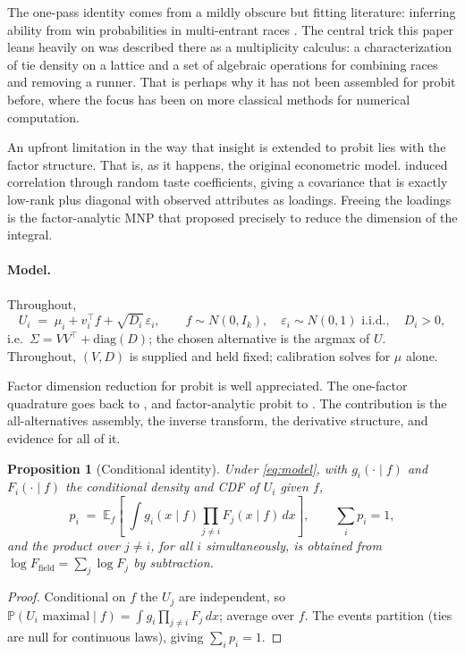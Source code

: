 \documentclass[12pt]{article}
\newtheorem{proposition}{Proposition}
\theoremstyle{remark}
\newcommand{\E}{\mathbb{E}}
\newcommand{\Prob}{\mathbb{P}}
\begin{document}
The one-pass identity comes from a mildly obscure but fitting literature: inferring ability
from win probabilities in multi-entrant races \citep{cotton2021}. The central trick this paper
leans heavily on was described there as a multiplicity calculus: a characterization of tie density 
on a lattice and a set of algebraic operations for combining races and removing a runner. That is
perhaps why it has not been assembled for probit before, where the focus has been on more classical methods
for numerical computation. 

An upfront limitation in the way that insight is extended to probit lies with the factor structure. That is, as it happens,
the original econometric model. \citet{hausman1978} induced correlation
through random taste coefficients, giving a covariance that is exactly
low-rank plus diagonal with observed attributes as loadings. Freeing the
loadings is the factor-analytic MNP that \citet{mcfadden1984} proposed
precisely to reduce the dimension of the integral. 

\paragraph{Model.} Throughout,
\begin{equation}
U_i \;=\; \mu_i + v_i^\top f + \sqrt{D_i}\,\varepsilon_i,
\qquad f \sim N(0, I_k), \quad \varepsilon_i \sim N(0,1) \text{ i.i.d.},
\quad D_i > 0,
\label{eq:model}
\end{equation}
i.e.\ $\Sigma = VV^\top + \mathrm{diag}(D)$; the chosen alternative is the
argmax of $U$. Throughout, $(V, D)$ is supplied and held fixed;
calibration solves for $\mu$ alone.

Factor dimension reduction for probit
is well appreciated. The one-factor quadrature goes back to \citet{butler1982},
and factor-analytic probit to \citet{elrod1995}. The
contribution is the all-alternatives assembly, the inverse transform, the
derivative structure, and evidence for all of it.

\begin{proposition}[Conditional identity]\label{prop:identity}
Under \eqref{eq:model}, with $g_i(\cdot \mid f)$ and $F_i(\cdot \mid f)$
the conditional density and CDF of $U_i$ given $f$,
\begin{equation}
p_i \;=\; \E_f\!\left[\;\int g_i(x \mid f)
\prod_{j \neq i} F_j(x \mid f)\, dx \right],
\qquad \sum_i p_i = 1,
\label{eq:forward}
\end{equation}
and the product over $j \ne i$, for all $i$ simultaneously, is obtained from
$\log F_{\mathrm{field}} = \sum_j \log F_j$ by subtraction.
\end{proposition}
\begin{proof}
Conditional on $f$ the $U_j$ are independent, so $\Prob(U_i \text{ maximal}
\mid f) = \int g_i \prod_{j\ne i} F_j\,dx$; average over $f$. The events
partition (ties are null for continuous laws), giving $\sum_i p_i = 1$.
\end{proof}
\end{document}

